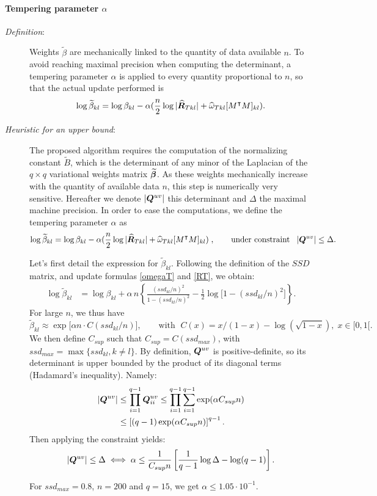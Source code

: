 \paragraph{Tempering parameter $\alpha$} \label{alpha}
\begin{description}
\item[\textit{Definition}: ]Weights $\widetilde{\beta}$ are mechanically linked to the quantity of data available $n$. To avoid reaching maximal precision when computing the determinant, a tempering parameter $\alpha$ is applied to every quantity proportional to $n$, so that the actual update performed is $$\log \widetilde{\beta}_{kl} = \log \beta_{kl} - \alpha(\frac{n}{2}\log|\widehat{{\boldsymbol{R}}}_{Tkl}| + \widehat{\omega}_{Tkl} [M^\intercal M]_{kl}).$$
\item[\textit{Heuristic for an upper bound}: ] The proposed algorithm requires the computation of the normalizing constant $\widetilde{B}$, which is the determinant of any minor of the Laplacian  of the $q\times q$ variational weights matrix ${\widetilde{{\boldsymbol{\beta}}}}$. As these weights  mechanically increase with the quantity of available data $n$, this step is numerically very sensitive.  Hereafter we denote $|{\boldsymbol{Q}}^{uv}|$ this determinant and $\Delta$ the maximal machine precision. In order to ease the computations, we define the tempering parameter $\alpha$ as $$\log \widetilde{\beta}_{kl} = \log \beta_{kl} - \alpha(\frac{n}{2}\log|\widehat{{\boldsymbol{R}}}_{Tkl}| + \widehat{\omega}_{Tkl} [M^\intercal M]_{kl})\;,\qquad \text{under constraint}\;\;\; |{\boldsymbol{Q}}^{uv}| \leq \Delta.$$

Let's first detail the expression for $\widetilde{\beta}_{kl}$. Following the definition of the $SSD$ matrix, and update formulas \eqref{omegaT} and \eqref{RT}, we obtain:
\begin{align*}
    \log \widetilde{\beta}_{kl} &=\log \beta_{kl} +\alpha \,n\left\{\frac{(ssd_{kl}/n)^2}{1-(ssd_{kl}/n)^2} -\frac12\log\big[1-(ssd_{kl}/n)^2\big]\right\}.
\end{align*}
For large $n$, we thus have $$\widetilde{\beta}_{kl}\approx \exp \big[\alpha n \cdot C(ssd_{kl}/n)\big], \qquad \text{with }\; C(x)=x/(1-x) -\log(\sqrt{1-x}),\; x\in [0,1[.$$ 
We then define $C_{sup}$ such that $C_{sup} = C(ssd_{max})$, with $ ssd_{max}=\max\{ssd_{kl}, k\neq l\}$.
By definition, ${\boldsymbol{Q}}^{uv}$ is positive-definite, so its determinant is upper bounded by the product of its diagonal terms (Hadamard's inequality). Namely:
\begin{align*}
    |{\boldsymbol{Q}}^{uv}|&\leq \prod_{i=1}^{q-1} {\boldsymbol{Q}}^{uv}_{ii} \leq \prod_{i=1}^{q-1}\sum_{i=1}^{q-1} \exp (\alpha C_{sup} n)\\
    &\leq \left[(q-1)\exp(\alpha C_{sup} n)\right]^{q-1}.
\end{align*}
Then applying the constraint yields:
\begin{align*}
    |{\boldsymbol{Q}}^{uv}| \leq \Delta \iff  \alpha \leq \frac{1}{C_{sup} n} \left[ \frac{1}{q-1}\log \Delta - \log(q-1)\right].
\end{align*}

For $ssd_{max}=0.8$, $n=200$ and $q=15$, we get $\alpha \leq 1.05\cdot 10^{-1}$.
\end{description}


